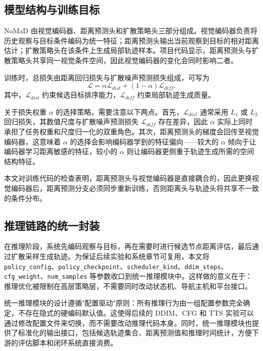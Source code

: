 \subsection{模型结构与训练目标}

NoMaD 由视觉编码器、距离预测头和扩散策略头三部分组成\cite{nomad2023}。视觉编码器负责将历史观察与目标条件编码为统一特征；距离预测头输出当前观察到目标的相对距离估计；扩散策略头在该条件上生成局部轨迹样本。项目代码显示，距离预测头与扩散策略头共享同一视觉条件空间，因此视觉编码器的变化会同时影响二者。

训练时，总损失由距离回归损失与扩散噪声预测损失组成，可写为
\begin{equation}
\mathcal{L} = \alpha \mathcal{L}_{dist} + (1-\alpha)\mathcal{L}_{diff}.
\end{equation}
其中，$\mathcal{L}_{dist}$ 约束候选目标排序能力，$\mathcal{L}_{diff}$ 约束局部轨迹生成质量。

关于损失权重 $\alpha$ 的选择策略，需要注意以下两点。首先，$\mathcal{L}_{dist}$ 通常采用 $L_1$ 或 $L_2$ 回归损失，其数值尺度与扩散噪声预测损失 $\mathcal{L}_{diff}$ 存在差异，因此 $\alpha$ 实际上同时承担了任务权重和尺度归一化的双重角色。其次，距离预测头的梯度会回传至视觉编码器，这意味着 $\alpha$ 的选择会影响编码器学到的特征偏向——较大的 $\alpha$ 倾向于让编码器学习距离敏感的特征，较小的 $\alpha$ 则让编码器更侧重于轨迹生成所需的空间结构特征。

本文对训练代码的检查表明，距离预测头与视觉编码器是直接耦合的，因此更换视觉编码器后，距离预测分支必须同步重新训练，否则距离头与轨迹头将共享不一致的条件分布。

\subsection{推理链路的统一封装}

在推理阶段，系统先编码观察与目标，再在需要时进行候选节点距离评估，最后通过扩散采样生成轨迹。为保证后续实验和系统章节可复用，本文将 \texttt{policy\_config}、\texttt{policy\_checkpoint}、\texttt{scheduler\_kind}、\texttt{ddim\_steps}、\texttt{cfg\_weight}、\texttt{num\_samples} 等参数收口到统一推理模块中。这样做的意义在于：推理优化被限制在高层策略层，不需要同时改动状态机、导航主机和平台接口。

统一推理模块的设计遵循"配置驱动"原则：所有推理行为由一组配置参数完全确定，不存在隐式的硬编码默认值。这使得后续的 DDIM、CFG 和 TTS 实验可以通过修改配置文件来切换，而不需要改动推理代码本身。同时，统一推理模块也提供了标准化的输出接口，包括候选轨迹集合、距离预测值和推理时间统计，方便下游的评估脚本和闭环系统直接消费。

